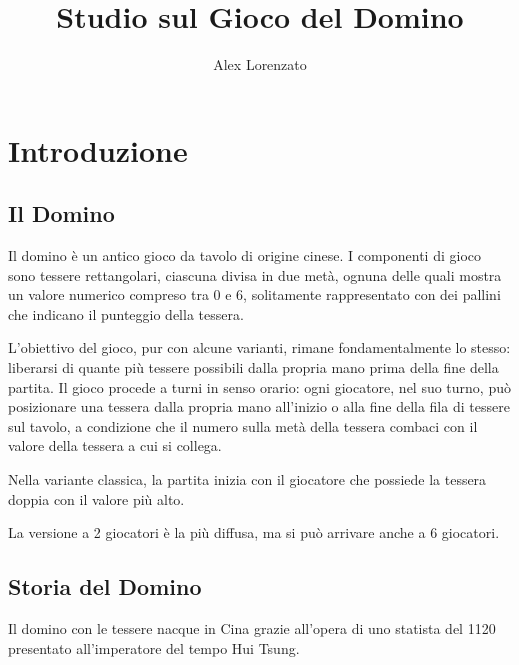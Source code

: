 \documentclass[a4paper.12pt]{report} %
\begin{document}
\title{Studio sul Gioco del Domino}
\author{Alex Lorenzato}
\maketitle

\tableofcontents %



\chapter{Introduzione}

\section{Il Domino}

Il domino è un antico gioco da tavolo di origine cinese. I componenti di gioco sono tessere rettangolari, ciascuna divisa in due metà, ognuna delle quali mostra un valore numerico compreso tra 0 e 6, solitamente rappresentato con dei pallini che indicano il punteggio della tessera.

L'obiettivo del gioco, pur con alcune varianti, rimane fondamentalmente lo stesso: liberarsi di quante più tessere possibili dalla propria mano prima della fine della partita. Il gioco procede a turni in senso orario: ogni giocatore, nel suo turno, può posizionare una tessera dalla propria mano all'inizio o alla fine della fila di tessere sul tavolo, a condizione che il numero sulla metà della tessera combaci con il valore della tessera a cui si collega.

Nella variante classica, la partita inizia con il giocatore che possiede la tessera doppia con il valore più alto. 

La versione a 2 giocatori è la più diffusa, ma si può arrivare anche a 6 giocatori.


\section{Storia del Domino}

Il domino con le tessere nacque in Cina grazie all'opera di uno statista del 1120 presentato all'imperatore del tempo Hui Tsung. 
\end{document}

